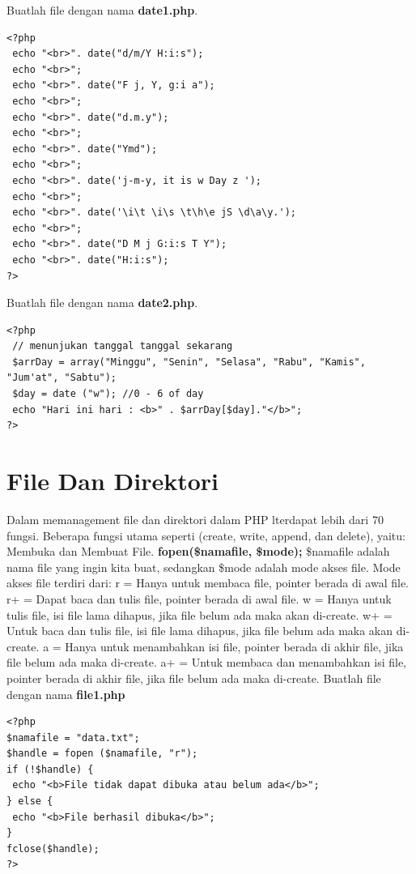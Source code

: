  Buatlah file dengan nama \textbf{date1.php}.
\begin{lstlisting}
<?php
 echo "<br>". date("d/m/Y H:i:s");
 echo "<br>";
 echo "<br>". date("F j, Y, g:i a"); 
 echo "<br>";
 echo "<br>". date("d.m.y"); 
 echo "<br>";
 echo "<br>". date("Ymd"); 
 echo "<br>";
 echo "<br>". date('j-m-y, it is w Day z '); 
 echo "<br>";
 echo "<br>". date('\i\t \i\s \t\h\e jS \d\a\y.'); 
 echo "<br>";
 echo "<br>". date("D M j G:i:s T Y");
 echo "<br>". date("H:i:s"); 
?>
\end{lstlisting}

 Buatlah file dengan nama \textbf{date2.php}.
\begin{lstlisting}
<?php
 // menunjukan tanggal tanggal sekarang
 $arrDay = array("Minggu", "Senin", "Selasa", "Rabu", "Kamis", "Jum'at", "Sabtu");
 $day = date ("w"); //0 - 6 of day
 echo "Hari ini hari : <b>" . $arrDay[$day]."</b>";
?>
\end{lstlisting}

\section{File Dan Direktori}
Dalam memanagement file dan direktori dalam PHP lterdapat lebih dari 70 fungsi. Beberapa fungsi utama seperti (create, write, append, dan delete), yaitu: Membuka dan Membuat File.
\newline
\textbf{fopen(\$namafile, \$mode);}
\newline
\$namafile adalah nama file yang ingin kita buat, sedangkan \$mode adalah mode akses file. Mode akses file terdiri dari: 
\newline
r = Hanya untuk membaca file, pointer berada di awal file.
\newline
r+ = Dapat baca dan tulis file, pointer berada di awal file.
\newline
w = Hanya untuk tulis file, isi file lama dihapus, jika file belum ada maka akan di-create.
\newline
w+ = Untuk baca dan tulis file, isi file lama dihapus, jika file belum ada maka akan di-create.
\newline
a = Hanya untuk menambahkan isi file, pointer berada di akhir file, jika file belum ada maka di-create.
\newline
a+ = Untuk membaca dan menambahkan isi file, pointer berada di akhir file, jika file belum ada maka di-create.
\newline
 Buatlah file dengan nama \textbf{file1.php}
\begin{lstlisting}
<?php
$namafile = "data.txt";
$handle = fopen ($namafile, "r");
if (!$handle) {
 echo "<b>File tidak dapat dibuka atau belum ada</b>";
} else {
 echo "<b>File berhasil dibuka</b>";
}
fclose($handle);
?> 
\end{lstlisting}

